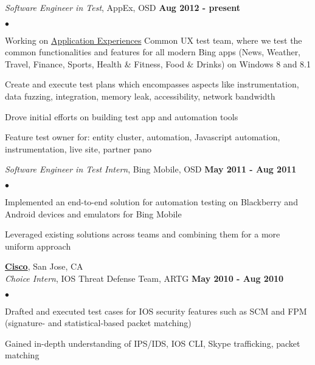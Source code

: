 \documentclass[margin,line]{res}
\newenvironment{list2}
  {\vspace{-4mm}
   \begin{list}{$\bullet$}{
     \setlength{\itemsep}{0in}
     \setlength{\parsep}{0in} \setlength{\parskip}{0in}
     \setlength{\topsep}{0in} \setlength{\partopsep}{0in}
     \setlength{\leftmargin}{0.18in}}}
  {\end{list}}
\begin{document}
\begin{resume}
{\em Software Engineer in Test}, AppEx, OSD                       \hfill {\bf Aug 2012 - present} \\
\begin{list2}
\item Working on \href{http://www.zdnet.com/microsofts-latest-search-share-attack-plan-focus-on-mobile-apps-7000008908/}{Application Experiences}
  Common UX test team, where we test the common functionalities and features for all modern Bing apps
  (News, Weather, Travel, Finance, Sports, Health \& Fitness, Food \& Drinks) on Windows 8 and 8.1
\item Create and execute test plans which encompasses aspects like instrumentation, data fuzzing, integration,
  memory leak, accessibility, network bandwidth
\item Drove initial efforts on building test app and automation tools
\item Feature test owner for: entity cluster, automation, Javascript automation, instrumentation, live site, partner pano
\end{list2}

{\em Software Engineer in Test Intern}, Bing Mobile, OSD          \hfill {\bf May 2011 - Aug 2011} \\
\begin{list2}
\item Implemented an end-to-end solution for automation testing on Blackberry and Android devices 
  and emulators for Bing Mobile
\item Leveraged existing solutions across teams and combining them for a more uniform approach
\end{list2}

{\bf \href{http://cisco.com}{Cisco}}, San Jose, CA \\
{\em Choice Intern}, IOS Threat Defense Team, ARTG                \hfill {\bf May 2010 - Aug 2010}\\
\begin{list2}
\item Drafted and executed test cases for IOS security features such as SCM and FPM
  (signature- and statistical-based packet matching)
\item Gained in-depth understanding of IPS/IDS, IOS CLI, Skype trafficking, packet matching
\end{list2}


\end{resume}
\end{document}
